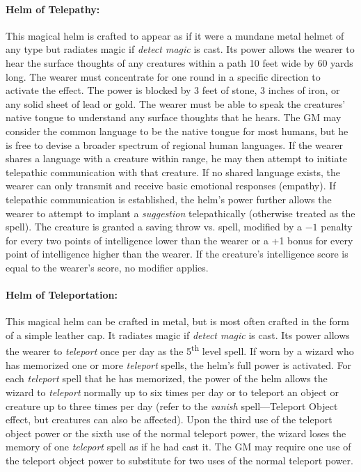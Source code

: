 \begin{multicols}{2}
\paragraph{Helm of Telepathy:} This magical helm is crafted to appear as if it were a mundane metal helmet of any type but radiates magic if \textit{detect magic} is cast.  Its power allows the wearer to hear the surface thoughts of any creatures within a path 10 feet wide by 60 yards long.  The wearer must concentrate for one round in a specific direction to activate the effect.  The power is blocked by 3 feet of stone, 3 inches of iron, or any solid sheet of lead or gold.  The wearer must be able to speak the creatures' native tongue to understand any surface thoughts that he hears.  The GM may consider the common language to be the native tongue for most humans, but he is free to devise a broader spectrum of regional human languages.  If the wearer shares a language with a creature within range, he may then attempt to initiate telepathic communication with that creature.  If no shared language exists, the wearer can only transmit and receive basic emotional responses (empathy).  If telepathic communication is established, the helm's power further allows the wearer to attempt to implant a \textit{suggestion} telepathically (otherwise treated as the spell).  The creature is granted a saving throw vs. spell, modified by a $-1$ penalty for every two points of intelligence lower than the wearer or a +1 bonus for every point of intelligence higher than the wearer.  If the creature's intelligence score is equal to the wearer's score, no modifier applies.

\paragraph{Helm of Teleportation:} This magical helm can be crafted in metal, but is most often crafted in the form of a simple leather cap.  It radiates magic if \textit{detect magic} is cast.  Its power allows the wearer to \textit{teleport} once per day as the 5\textsuperscript{th} level spell.  If worn by a wizard who has memorized one or more \textit{teleport} spells, the helm's full power is activated.  For each \textit{teleport} spell that he has memorized, the power of the helm allows the wizard to \textit{teleport} normally up to six times per day or to teleport an object or creature up to three times per day (refer to the \textit{vanish} spell---Teleport Object effect, but creatures can also be affected).  Upon the third use of the teleport object power or the sixth use of the normal teleport power, the wizard loses the memory of one \textit{teleport} spell as if he had cast it.  The GM may require one use of the teleport object power to substitute for two uses of the normal teleport power.


\end{multicols}
